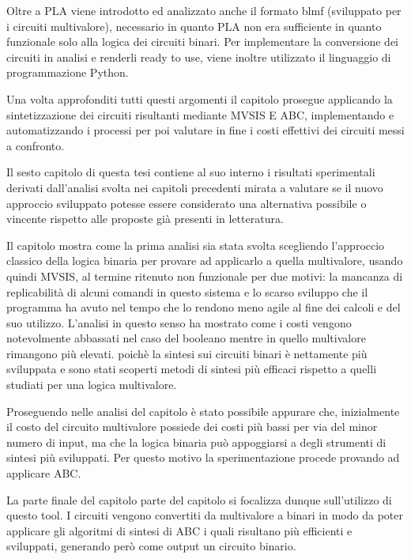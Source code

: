 \documentclass[
]{book}
\begin{document}
Oltre a PLA viene introdotto ed analizzato anche il formato blmf (sviluppato per i circuiti multivalore), necessario in quanto PLA non era sufficiente in quanto funzionale solo alla logica dei circuiti binari.
Per implementare la conversione dei circuiti in analisi e renderli ready to use, viene inoltre utilizzato il linguaggio di programmazione Python.

Una volta approfonditi tutti questi argomenti il capitolo prosegue applicando la sintetizzazione dei circuiti risultanti mediante MVSIS E ABC, implementando e automatizzando i processi per poi valutare in fine i costi effettivi dei circuiti messi a confronto.

\newpage

Il sesto capitolo di questa tesi contiene al suo interno i risultati sperimentali derivati dall'analisi svolta nei capitoli precedenti mirata a valutare se il nuovo approccio sviluppato potesse essere considerato una alternativa possibile o vincente rispetto alle proposte già presenti in letteratura.

Il capitolo mostra come la prima analisi sia stata svolta scegliendo l'approccio classico della logica binaria per provare ad applicarlo a quella multivalore, usando quindi MVSIS, al termine ritenuto non funzionale per due motivi: la mancanza di replicabilità di alcuni comandi in questo sistema e lo scarso sviluppo che il programma ha avuto nel tempo che lo rendono meno agile al fine dei calcoli e del suo utilizzo. L'analisi in questo senso ha mostrato come i costi vengono notevolmente abbassati nel caso del booleano mentre in quello multivalore rimangono più elevati. poichè la sintesi sui circuiti binari è nettamente più sviluppata e sono stati scoperti metodi di sintesi più efficaci rispetto a quelli studiati per una logica multivalore.

Proseguendo nelle analisi del capitolo è stato possibile appurare che, inizialmente il costo del circuito multivalore possiede dei costi più bassi per via del minor numero di input, ma che la logica binaria può appoggiarsi a degli strumenti di sintesi più sviluppati. Per questo motivo la sperimentazione procede provando ad applicare ABC.

La parte finale del capitolo parte del capitolo si focalizza dunque sull'utilizzo di questo tool. I circuiti vengono convertiti da multivalore a binari in modo da poter applicare gli algoritmi di sintesi di ABC i quali risultano più efficienti e sviluppati, generando però come output un circuito binario.
\end{document}
